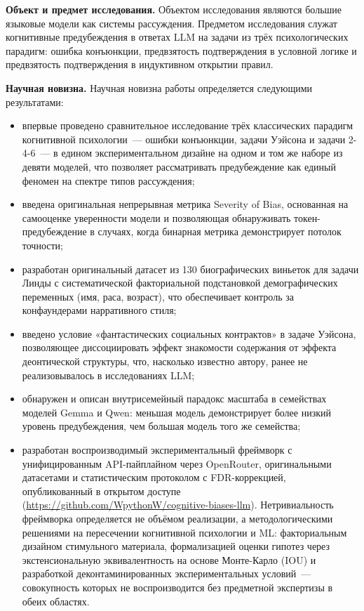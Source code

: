 \textbf{Объект и предмет исследования.}
Объектом исследования являются большие языковые модели как системы рассуждения. Предметом исследования служат когнитивные предубеждения в ответах LLM на задачи из трёх психологических парадигм: ошибка конъюнкции, предвзятость подтверждения в условной логике и предвзятость подтверждения в индуктивном открытии правил.

\textbf{Научная новизна.}
Научная новизна работы определяется следующими результатами:
\begin{itemize}
  \item впервые проведено сравнительное исследование трёх классических парадигм когнитивной психологии~--- ошибки конъюнкции, задачи Уэйсона и задачи 2-4-6~--- в едином экспериментальном дизайне на одном и том же наборе из девяти моделей, что позволяет рассматривать предубеждение как единый феномен на спектре типов рассуждения;
  \item введена оригинальная непрерывная метрика Severity of Bias, основанная на самооценке уверенности модели и позволяющая обнаруживать токен-предубеждение в случаях, когда бинарная метрика демонстрирует потолок точности;
  \item разработан оригинальный датасет из 130 биографических виньеток для задачи Линды с систематической факториальной подстановкой демографических переменных (имя, раса, возраст), что обеспечивает контроль за конфаундерами нарративного стиля;
  \item введено условие «фантастических социальных контрактов» в задаче Уэйсона, позволяющее диссоциировать эффект знакомости содержания от эффекта деонтической структуры, что, насколько известно автору, ранее не реализовывалось в исследованиях LLM;
  \item обнаружен и описан внутрисемейный парадокс масштаба в семействах моделей Gemma и Qwen: меньшая модель демонстрирует более низкий уровень предубеждения, чем большая модель того же семейства;
  \item разработан воспроизводимый экспериментальный фреймворк с унифицированным API-пайплайном через OpenRouter, оригинальными датасетами и статистическим протоколом с FDR-коррекцией, опубликованный в открытом доступе (\url{https://github.com/WpythonW/cognitive-biases-llm}). Нетривиальность фреймворка определяется не объёмом реализации, а методологическими решениями на пересечении когнитивной психологии и ML: факториальным дизайном стимульного материала, формализацией оценки гипотез через экстенсиональную эквивалентность на основе Монте-Карло (IOU) и разработкой деконтаминированных экспериментальных условий~--- совокупность которых не воспроизводится без предметной экспертизы в обеих областях.
\end{itemize}

